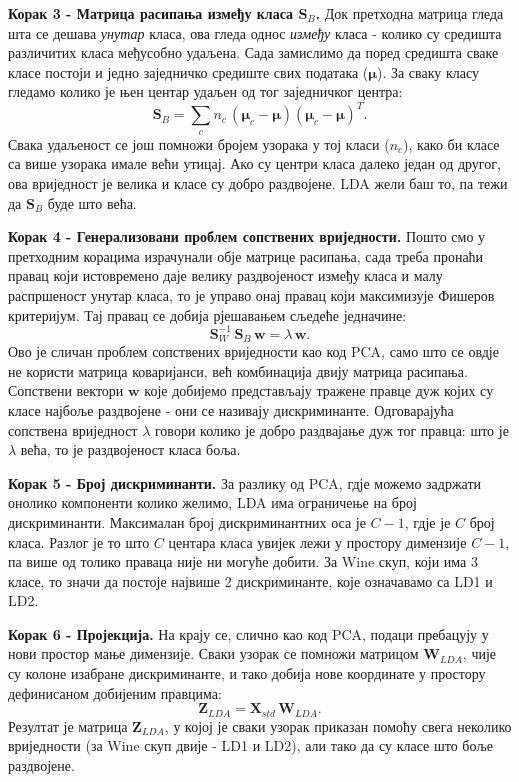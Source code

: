 \documentclass{article}
\begin{document}
	\textbf{Корак 3 - Матрица расипања између класа $\mathbf{S}_B$.} Док претходна матрица гледа шта се дешава \textit{унутар} класа, ова гледа однос \textit{између} класа - колико су средишта различитих класа међусобно удаљена. Сада замислимо да поред средишта сваке класе постоји и једно заједничко средиште свих података ($\boldsymbol{\mu}$). За сваку класу гледамо колико је њен центар удаљен од тог заједничког центра:
	\begin{equation} \label{eq:sb}
		\mathbf{S}_B = \sum_c n_c\,(\boldsymbol{\mu}_c - \boldsymbol{\mu})(\boldsymbol{\mu}_c - \boldsymbol{\mu})^T.
	\end{equation}
	Свака удаљеност се још помножи бројем узорака у тој класи ($n_c$), како би класе са више узорака имале већи утицај. Ако су центри класа далеко један од другог, ова вриједност је велика и класе су добро раздвојене. LDA жели баш то, па тежи да $\mathbf{S}_B$ буде што већа.
	
	\textbf{Корак 4 - Генерализовани проблем сопствених вриједности.} Пошто смо у претходним корацима израчунали обје матрице расипања, сада треба пронаћи правац који истовремено даје велику раздвојеност између класа и малу распршеност унутар класа, то је управо онај правац који максимизује Фишеров критеријум. Тај правац се добија рјешавањем сљедеће једначине:
	\begin{equation} \label{eq:lda_eig}
		\mathbf{S}_W^{-1}\,\mathbf{S}_B\,\mathbf{w} = \lambda\,\mathbf{w}.
	\end{equation}
	Ово је сличан проблем сопствених вриједности као код PCA, само што се овдје не користи матрица коваријанси, већ комбинација двију матрица расипања. Сопствени вектори $\mathbf{w}$ које добијемо представљају тражене правце дуж којих су класе најбоље раздвојене - они се називају дискриминанте. Одговарајућа сопствена вриједност $\lambda$ говори колико је добро раздвајање дуж тог правца: што је $\lambda$ већа, то је раздвојеност класа боља.
	
	\textbf{Корак 5 - Број дискриминанти.} За разлику од PCA, гдје можемо задржати онолико компоненти колико желимо, LDA има ограничење на број дискриминанти. Максималан број дискриминантних оса је $C-1$, гдје је $C$ број класа. Разлог је то што $C$ центара класа увијек лежи у простору димензије $C-1$, па више од толико праваца није ни могуће добити. За Wine скуп, који има 3 класе, то значи да постоје највише 2 дискриминанте, које означавамо са LD1 и LD2.
	
	\textbf{Корак 6 - Пројекција.} На крају се, слично као код PCA, подаци пребацују у нови простор мање димензије. Сваки узорак се помножи матрицом $\mathbf{W}_{LDA}$, чије су колоне изабране дискриминанте, и тако добија нове координате у простору дефинисаном добијеним правцима:
	\begin{equation} \label{eq:lda_proj}
		\mathbf{Z}_{LDA} = \mathbf{X}_{std}\,\mathbf{W}_{LDA}.
	\end{equation}
	Резултат је матрица $\mathbf{Z}_{LDA}$, у којој је сваки узорак приказан помоћу свега неколико вриједности (за Wine скуп двије - LD1 и LD2), али тако да су класе што боље раздвојене.
	
\end{document}
